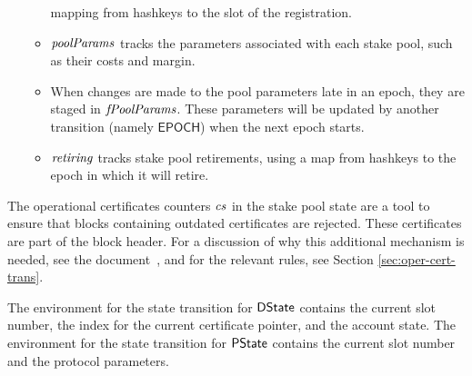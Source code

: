 \begin{itemize}
\begin{itemize}
        mapping from hashkeys to the slot of the registration.
      \item $\mathit{poolParams}$ tracks the parameters associated with each stake pool, such as
        their costs and margin.
      \item When changes are made to the pool parameters late in an epoch, they are staged
        in $\mathit{fPoolParams}$.
        These parameters will be updated by another transition (namely $\mathsf{EPOCH}$)
        when the next epoch starts.
      \item $\mathit{retiring}$ tracks stake pool retirements, using a map from hashkeys to
        the epoch in which it will retire.
    \end{itemize}
\end{itemize}

The operational certificates counters $\mathit{cs}$ in the stake pool state are a
tool to ensure that blocks containing outdated certificates are rejected.
These certificates are part of the block header.
For a discussion of why this additional mechanism is needed,
see the document~\cite{delegation_design}, and for
the relevant rules, see Section \ref{sec:oper-cert-trans}.

The environment for the state transition for $\mathsf{DState}$ contains the current slot number,
the index for the current certificate pointer, and the account state.
The environment for the state transition for $\mathsf{PState}$ contains the current slot number
and the protocol parameters.

